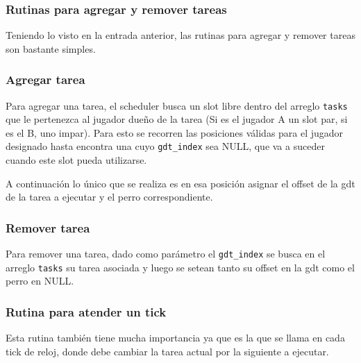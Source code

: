 \subsubsection{Rutinas para agregar y remover tareas}

Teniendo lo visto en la entrada anterior, las rutinas para agregar y remover
tareas son bastante simples.

\subsubsection*{Agregar tarea}

Para agregar una tarea, el scheduler busca un slot libre dentro del arreglo
\texttt{tasks} que le pertenezca al jugador dueño de la tarea (Si es el jugador
A un slot par, si es el B, uno impar). Para esto se recorren las posiciones
válidas para el jugador designado hasta encontra una cuyo \texttt{gdt\_index}
sea NULL, que va a suceder cuando este slot pueda utilizarse.

A continuación lo único que se realiza es en esa posición asignar el offset de
la gdt de la tarea a ejecutar y el perro correspondiente.

\subsubsection*{Remover tarea}

Para remover una tarea, dado como parámetro el \texttt{gdt\_index} se busca en
el arreglo \texttt{tasks} su tarea asociada y luego se setean tanto su offset en
la gdt como el perro en NULL.

\subsubsection{Rutina para atender un tick}

Esta rutina también tiene mucha importancia ya que es la que se llama en cada
tick de reloj, donde debe cambiar la tarea actual por la siguiente a ejecutar.

